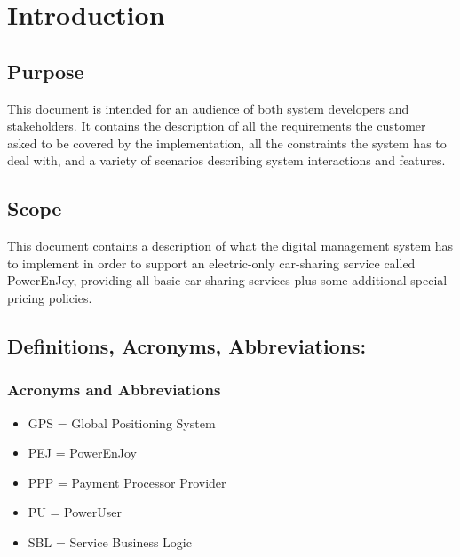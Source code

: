 \section{Introduction}
\subsection{Purpose}
This document is intended for an audience of both system developers and stakeholders. It contains the description of all the requirements the customer asked to be covered by the implementation, all the constraints the system has to deal with, and a variety of scenarios describing system interactions and features.
\subsection{Scope}
This document contains a description of what the digital management system has to implement in order to support an electric-only car-sharing service called PowerEnJoy, providing all basic car-sharing services plus some additional special pricing policies.
\subsection{Definitions, Acronyms, Abbreviations:}
\subsubsection{Acronyms and Abbreviations}
\begin{itemize}
\item GPS = Global Positioning System
\item PEJ = PowerEnJoy
\item PPP = Payment Processor Provider
\item PU = PowerUser
\item SBL = Service Business Logic
\end{itemize}
